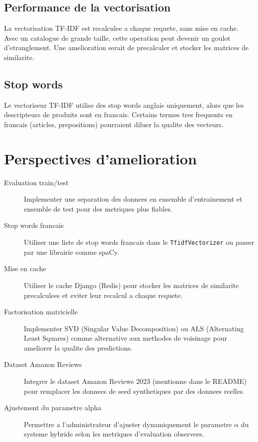 \documentclass[12pt,a4paper]{report}
\begin{document}
\subsection{Performance de la vectorisation}

La vectorisation TF-IDF est recalculee a chaque requete, sans mise en cache.
Avec un catalogue de grande taille, cette operation peut devenir un goulot
d'etranglement. Une amelioration serait de precalculer et stocker les matrices
de similarite.

\subsection{Stop words}

Le vectoriseur TF-IDF utilise des stop words anglais uniquement, alors que les
descripteurs de produits sont en francais. Certains termes tres frequents en
francais (articles, prepositions) pourraient diluer la qualite des vecteurs.

\section{Perspectives d'amelioration}

\begin{description}
  \item[Evaluation train/test] Implementer une separation des donnees en
    ensemble d'entrainement et ensemble de test pour des metriques plus fiables.
  \item[Stop words francais] Utiliser une liste de stop words francais dans
    le \texttt{TfidfVectorizer} ou passer par une librairie comme spaCy.
  \item[Mise en cache] Utiliser le cache Django (Redis) pour stocker les
    matrices de similarite precalculees et eviter leur recalcul a chaque requete.
  \item[Factorisation matricielle] Implementer SVD (Singular Value Decomposition)
    ou ALS (Alternating Least Squares) comme alternative aux methodes
    de voisinage pour ameliorer la qualite des predictions.
  \item[Dataset Amazon Reviews] Integrer le dataset Amazon Reviews 2023
    (mentionne dans le README) pour remplacer les donnees de seed synthetiques
    par des donnees reelles.
  \item[Ajustement du parametre alpha] Permettre a l'administrateur d'ajuster
    dynamiquement le parametre $\alpha$ du systeme hybride selon les metriques
    d'evaluation observees.
\end{description}
\end{document}
